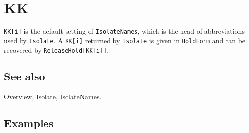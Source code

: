 \documentclass[../FeynCalcManual.tex]{subfiles}
\begin{document}
\hypertarget{kk}{
\section{KK}\label{kk}}

\texttt{KK[\allowbreak{}i]} is the default setting of
\texttt{IsolateNames}, which is the head of abbreviations used by
\texttt{Isolate}. A \texttt{KK[\allowbreak{}i]} returned by
\texttt{Isolate} is given in \texttt{HoldForm} and can be recovered by
\texttt{ReleaseHold[\allowbreak{}KK[\allowbreak{}i]]}.

\subsection{See also}

\hyperlink{toc}{Overview}, \hyperlink{isolate}{Isolate},
\hyperlink{isolatenames}{IsolateNames}.

\subsection{Examples}
\end{document}
